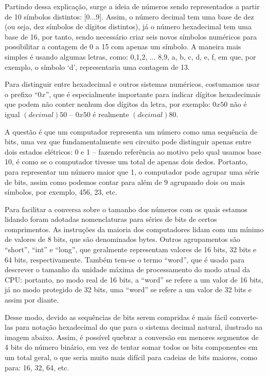 Partindo dessa explicação, surge a ideia de números sendo representados a partir de 10 símbolos distintos: [0...9]. Assim, o número decimal tem uma base de dez (ou seja, dez símbolos de dígitos distintos), já o número hexadecimal tem uma base de 16, por tanto, sendo necessário criar seis novos símbolos numéricos para possibilitar a contagem de 0 a 15 com apenas um símbolo. A maneira mais simples é usando algumas letras, como: 0,1,2, ... 8,9, a, b, c, d, e, f, em que, por exemplo, o símbolo `d', representaria uma contagem de 13.

Para distinguir entre hexadecimal e outros sistemas numéricos, costumamos usar o prefixo ``$0x$'', que é especialmente importante para indicar dígitos hexadecimais que podem não conter nenhum dos dígitos da letra, por exemplo: $0x50$ não é igual $(decimal) 50$ – $0x50$ é realmente $(decimal) 80$.

A questão é que um computador representa um número como uma sequência de bits, uma vez que fundamentalmente seu circuito pode distinguir apenas entre dois estados elétricos: 0 e 1 – fazendo referência ao motivo pelo qual usamos base 10, é como se o computador tivesse um total de apenas dois dedos. Portanto, para representar um número maior que 1, o computador pode agrupar uma série de bits, assim como podemos contar para além de 9 agrupando dois ou mais símbolos, por exemplo, 456, 23, etc.

Para facilitar a conversa sobre o tamanho dos números com os quais estamos lidando foram adotadas nomenclaturas para séries de bits de certos comprimentos. As instruções da maioria dos computadores lidam com um mínimo de valores de 8 bits, que são denominados bytes. Outros agrupamentos são ``short'', ``int'' e ``long'', que geralmente representam valores de 16 bits, 32 bits e 64 bits, respectivamente. Também tem-se o termo ``word'', que é usado para descrever o tamanho da unidade máxima de processamento do modo atual da CPU: portanto, no modo real de 16 bits, a ``word'' se refere a um valor de 16 bits, já no modo protegido de 32 bits, uma ``word'' se refere a um valor de 32 bits e assim por diante.

Desse modo, devido as sequências de bits serem compridas é mais fácil converte-las para notação hexadecimal do que para o sistema decimal natural, ilustrado na imagem abaixo. Assim, é possível quebrar a conversão em menores segmentos de 4 bits do número binário, em vez de tentar somar todos os bits componentes em um total geral, o que seria muito mais difícil para cadeias de bits maiores, como para: 16, 32, 64, etc. 

